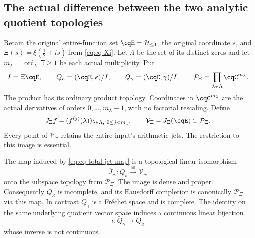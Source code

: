 \subsection{The actual difference between the two analytic quotient topologies}
\label{sec:cq-quotient-topologies}
Retain the original entire-function set $\cqE=\mathcal H_{\leq1}$,
the original coordinate $s$, and
$\Xi(s)=\xi(\tfrac12+is)$ from \eqref{eq:cq-Xi}.
Let $\Lambda$ be the set of its distinct zeros and let
$m_\lambda=\operatorname{ord}_\lambda\Xi\geq1$ be each actual
multiplicity. Put
\[
 I=\Xi\cqE,\qquad
 Q_\kappa=(\cqE,\kappa)/I,\qquad
 Q_\gamma=(\cqE,\gamma)/I,\qquad
 \mathcal P_\Xi=\prod_{\lambda\in\Lambda}\cqC^{m_\lambda}.
\]
The product has its ordinary product topology. Coordinates in
$\cqC^{m_\lambda}$ are the actual derivatives of orders
$0,\ldots,m_\lambda-1$, with no factorial rescaling. Define
\begin{equation}\label{eq:cq-total-jet-map}
 J_\Xi f=(f^{(j)}(\lambda))_{
          \lambda\in\Lambda,\ 0\leq j<m_\lambda},
 \qquad \mathcal V_\Xi=J_\Xi(\cqE)\subset\mathcal P_\Xi.
\end{equation}
Every point of $\mathcal V_\Xi$ retains the entire input's arithmetic
jets. The restriction to this image is essential.

\begin{cqtheorem}
\label{thm:cq-jet-topology}
The map induced by \eqref{eq:cq-total-jet-map} is a topological
linear isomorphism
\[
 \overline J_\Xi:Q_\kappa\xrightarrow{\ \cong\ }
 \mathcal V_\Xi
\]
onto the subspace topology from $\mathcal P_\Xi$.
The image is dense and proper. Consequently $Q_\kappa$ is
incomplete, and its Hausdorff completion is canonically
$\mathcal P_\Xi$ via this map. In contrast $Q_\gamma$ is a
Fr\'echet space and is complete. The identity on the same
underlying quotient vector space induces a continuous linear
bijection
\begin{equation}\label{eq:cq-topology-comparison-strict}
 \iota:Q_\gamma\longrightarrow Q_\kappa
\end{equation}
whose inverse is not continuous.
\end{cqtheorem}

